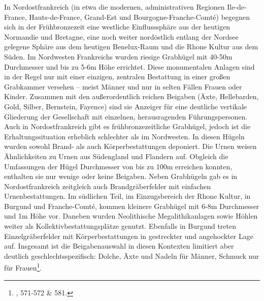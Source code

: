 \documentclass[openany,twoside,twocolumn]{book}
\let\rmarkdownfootnote\footnote%
\def\footnote{\protect\rmarkdownfootnote}
\begin{document}
In Nordostfrankreich (in etwa die modernen, administrativen Regionen
Ile-de-France, Hauts-de-France, Grand-Est und Bourgogne-Franche-Comté)
begegnen sich in der Frühbronzezeit eine westliche Einflusssphäre aus
der heutigen Normandie und Bretagne, eine noch weiter nordöstlich
entlang der Nordsee gelegene Sphäre aus dem heutigen Benelux-Raum und
die Rhone Kultur aus dem Süden. Im Nordwesten Frankreichs wurden riesige
Grabhügel mit 40-50m Durchmesser und bis zu 5-6m Höhe errichtet. Diese
monumentalen Anlagen sind in der Regel nur mit einer einzigen, zentralen
Bestattung in einer großen Grabkammer versehen -- meist Männer und nur
in selten Fällen Frauen oder Kinder. Zusammen mit den außerordentlich
reichen Beigaben (Äxte, Hellebarden, Gold, Silber, Bernstein, Fayence)
sind sie Anzeiger für eine deutliche vertikale Gliederung der
Gesellschaft mit einzelnen, herausragenden Führungspersonen. Auch in
Nordostfrankreich gibt es frühbronzezeitliche Grabhügel, jedoch ist die
Erhaltungssituation erheblich schlechter als im Nordwesten. In diesen
Hügeln wurden sowohl Brand- als auch Körperbestattungen deponiert. Die
Urnen weisen Ähnlichkeiten zu Urnen aus Südengland und Flandern auf.
Obgleich die Umfassungen der Hügel Durchmesser von bis zu 100m erreichen
konnten, enthalten sie nur wenige oder keine Beigaben. Neben Grabhügeln
gab es in Nordostfrankreich zeitgleich auch Brandgräberfelder mit
einfachen Urnenbestattungen. Im südlichen Teil, im Einzugsbereich der
Rhone Kultur, in Burgund und Franche-Comté, kommen kleinere Grabhügel
mit 6-8m Durchmesser und 1m Höhe vor. Daneben wurden Neolithische
Megalithikanlagen sowie Höhlen weiter als Kollektivbestattungsplätze
genutzt. Ebenfalls in Burgund treten Einzelgräberfelder mit
Körperbestattungen in gestreckter und angehockter Lage auf. Insgesamt
ist die Beigabenauswahl in diesen Kontexten limitiert aber deutlich
geschlechtsspezifisch: Dolche, Äxte und Nadeln für Männer, Schmuck nur
für Frauen\footnote{\textcite{mordant_bronze_2013}, 571-572 \& 581.}.
\end{document}
